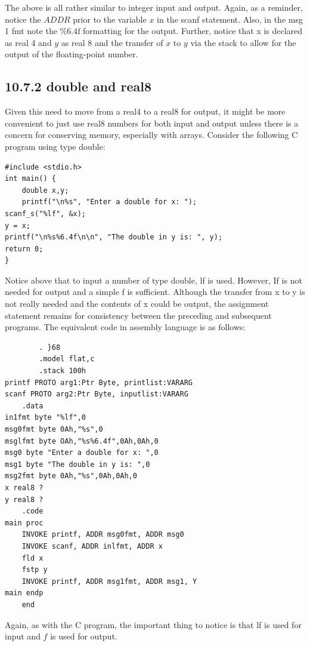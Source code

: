 \documentclass[10pt]{book}
\begin{document}
The above is all rather similar to integer input and output. Again, as a reminder, notice the $A D D R$ prior to the variable $x$ in the scanf statement. Also, in the msg 1 fmt note the $\% 6.4 \mathrm{f}$ formatting for the output. Further, notice that x is declared as real 4 and $y$ as real 8 and the transfer of $x$ to $y$ via the stack to allow for the output of the floating-point number.


\subsection*{10.7.2 double and real8}
Given this need to move from a real4 to a real8 for output, it might be more convenient to just use real8 numbers for both input and output unless there is a concern for conserving memory, especially with arrays. Consider the following C program using type double:

\begin{verbatim}
#include <stdio.h>
int main() {
    double x,y;
    printf("\n%s", "Enter a double for x: ");
scanf_s("%lf", &x);
y = x;
printf("\n%s%6.4f\n\n", "The double in y is: ", y);
return 0;
}
\end{verbatim}

Notice above that to input a number of type double, lf is used. However, If is not needed for output and a simple f is sufficient. Although the transfer from x to y is not really needed and the contents of x could be output, the assignment statement remains for consistency between the preceding and subsequent programs. The equivalent code in assembly language is as follows:


\begin{verbatim}
        . }68
        .model flat,c
        .stack 100h
printf PROTO arg1:Ptr Byte, printlist:VARARG
scanf PROTO arg2:Ptr Byte, inputlist:VARARG
    .data
in1fmt byte "%lf",0
msg0fmt byte 0Ah,"%s",0
msglfmt byte OAh,"%s%6.4f",0Ah,0Ah,0
msg0 byte "Enter a double for x: ",0
msg1 byte "The double in y is: ",0
msg2fmt byte 0Ah,"%s",0Ah,0Ah,0
x real8 ?
y real8 ?
    .code
main proc
    INVOKE printf, ADDR msg0fmt, ADDR msg0
    INVOKE scanf, ADDR inlfmt, ADDR x
    fld x
    fstp y
    INVOKE printf, ADDR msg1fmt, ADDR msg1, Y
main endp
    end
\end{verbatim}

Again, as with the C program, the important thing to notice is that lf is used for input and $f$ is used for output.
\end{document}
